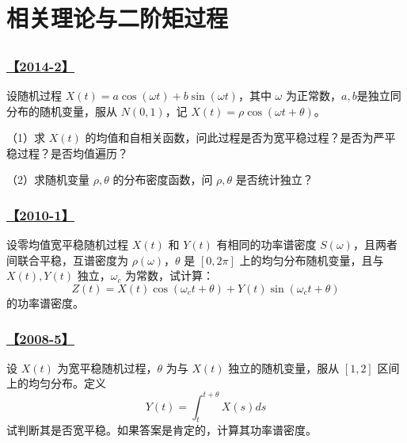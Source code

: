 \setcounter{section}{0}
\setcounter{subsection}{0}

\chapter{相关理论与二阶矩过程}

\section{}

\subsection{\hyperref[A2014-2]{【2014-2】}}\label{Q2014-2}

设随机过程 $X(t)=a \cos(\omega t) + b \sin(\omega t)$，其中 $\omega$ 为正常数，$a,b$是独立同分布的随机变量，服从 $N(0, 1)$，记 $X(t)=\rho \cos(\omega t+ \theta)$。

（1）求 $X(t)$ 的均值和自相关函数，问此过程是否为宽平稳过程？是否为严平稳过程？是否均值遍历？

（2）求随机变量 $\rho, \theta$ 的分布密度函数，问 $\rho, \theta$ 是否统计独立？

\subsection{\hyperref[A2010-1]{【2010-1】}}\label{Q2010-1}

设零均值宽平稳随机过程 $X(t)$ 和 $Y(t)$ 有相同的功率谱密度 $S(\omega)$，且两者间联合平稳，互谱密度为 $\rho(\omega)$，$\theta$ 是 $[0, 2\pi]$ 上的均匀分布随机变量，且与 $X(t), Y(t)$ 独立，$\omega_c$ 为常数，试计算：
$$
Z(t)=X(t)\cos(\omega_c t+\theta)+Y(t)\sin(\omega_ct+\theta)
$$
的功率谱密度。

\subsection{\hyperref[A2008-5]{【2008-5】}}\label{Q2008-5}

设 $X(t)$ 为宽平稳随机过程，$\theta$ 为与 $X(t)$ 独立的随机变量，服从 $[1, 2]$ 区间上的均匀分布。定义
$$
Y(t)=\int_t^{t+\theta}X(s)ds
$$
试判断其是否宽平稳。如果答案是肯定的，计算其功率谱密度。
\\\\
\section{}

